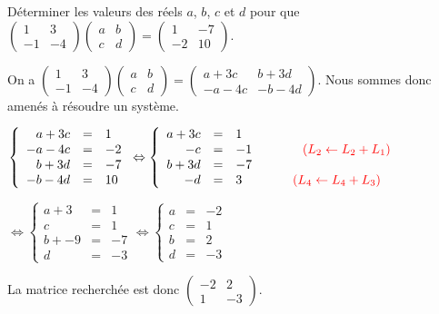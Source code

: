 \documentclass[11pt,fleqn]{book} %
\begin{document}
\begin{exercise}[topic=mat02]Déterminer les valeurs des réels $a$, $b$, $c$ et $d$ pour que $\begin{pmatrix}1 & 3 \\-1 & -4\end{pmatrix}\begin{pmatrix}a & b \\ c & d\end{pmatrix} = \begin{pmatrix}1 & -7 \\ -2 & 10\end{pmatrix}$.\end{exercise}

\begin{solution}On a \(\begin{pmatrix}1 & 3 \\-1 & -4\end{pmatrix}\begin{pmatrix}a & b \\ c & d\end{pmatrix} = \begin{pmatrix}a+3c & b+3d \\-a-4c & -b-4d\end{pmatrix}\). Nous sommes donc amenés à résoudre un système.

\(\left\{\begin{array}{rcl} a+3c&=& 1 \\ -a-4c & =& -2 \\ b + 3d &=&-7 \\ -b-4d &=& 10 \end{array} \right.\Leftrightarrow \left\{\begin{array}{rcl} a+3c&=& 1 \\ -c & =& -1 \qquad \qquad \color{red}{(L_2 \leftarrow L_2 + L_1) } \\ b + 3d &=&-7 \\ -d &=& 3 \qquad \qquad \color{red}{(L_4 \leftarrow L_4 + L_3) } \end{array}\right.\)

\(\Leftrightarrow \left\{\begin{array}{rcl} a+3&=& 1 \\ c & =& 1 \\ b + -9 &=&-7 \\ d &=& -3 \end{array}\right.\Leftrightarrow \left\{\begin{array}{rcl} a&=& -2 \\ c & =& 1 \\ b   &=&2 \\ d &=& -3 \end{array}\right. \)

La matrice recherchée est donc \(\begin{pmatrix} -2 & 2 \\ 1 & -3\end{pmatrix}\).\end{solution}
\end{document}
